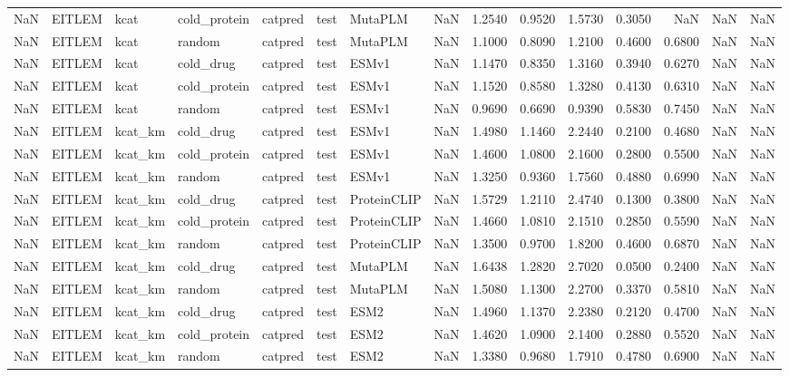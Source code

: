 \begin{tabular}{rlllllllrrrrrrr}
NaN & EITLEM & kcat & cold_protein & catpred & test & MutaPLM & NaN & 1.2540 & 0.9520 & 1.5730 & 0.3050 & NaN & NaN & NaN \\
NaN & EITLEM & kcat & random & catpred & test & MutaPLM & NaN & 1.1000 & 0.8090 & 1.2100 & 0.4600 & 0.6800 & NaN & NaN \\
NaN & EITLEM & kcat & cold_drug & catpred & test & ESMv1 & NaN & 1.1470 & 0.8350 & 1.3160 & 0.3940 & 0.6270 & NaN & NaN \\
NaN & EITLEM & kcat & cold_protein & catpred & test & ESMv1 & NaN & 1.1520 & 0.8580 & 1.3280 & 0.4130 & 0.6310 & NaN & NaN \\
NaN & EITLEM & kcat & random & catpred & test & ESMv1 & NaN & 0.9690 & 0.6690 & 0.9390 & 0.5830 & 0.7450 & NaN & NaN \\
NaN & EITLEM & kcat_km & cold_drug & catpred & test & ESMv1 & NaN & 1.4980 & 1.1460 & 2.2440 & 0.2100 & 0.4680 & NaN & NaN \\
NaN & EITLEM & kcat_km & cold_protein & catpred & test & ESMv1 & NaN & 1.4600 & 1.0800 & 2.1600 & 0.2800 & 0.5500 & NaN & NaN \\
NaN & EITLEM & kcat_km & random & catpred & test & ESMv1 & NaN & 1.3250 & 0.9360 & 1.7560 & 0.4880 & 0.6990 & NaN & NaN \\
NaN & EITLEM & kcat_km & cold_drug & catpred & test & ProteinCLIP & NaN & 1.5729 & 1.2110 & 2.4740 & 0.1300 & 0.3800 & NaN & NaN \\
NaN & EITLEM & kcat_km & cold_protein & catpred & test & ProteinCLIP & NaN & 1.4660 & 1.0810 & 2.1510 & 0.2850 & 0.5590 & NaN & NaN \\
NaN & EITLEM & kcat_km & random & catpred & test & ProteinCLIP & NaN & 1.3500 & 0.9700 & 1.8200 & 0.4600 & 0.6870 & NaN & NaN \\
NaN & EITLEM & kcat_km & cold_drug & catpred & test & MutaPLM & NaN & 1.6438 & 1.2820 & 2.7020 & 0.0500 & 0.2400 & NaN & NaN \\
NaN & EITLEM & kcat_km & random & catpred & test & MutaPLM & NaN & 1.5080 & 1.1300 & 2.2700 & 0.3370 & 0.5810 & NaN & NaN \\
NaN & EITLEM & kcat_km & cold_drug & catpred & test & ESM2 & NaN & 1.4960 & 1.1370 & 2.2380 & 0.2120 & 0.4700 & NaN & NaN \\
NaN & EITLEM & kcat_km & cold_protein & catpred & test & ESM2 & NaN & 1.4620 & 1.0900 & 2.1400 & 0.2880 & 0.5520 & NaN & NaN \\
NaN & EITLEM & kcat_km & random & catpred & test & ESM2 & NaN & 1.3380 & 0.9680 & 1.7910 & 0.4780 & 0.6900 & NaN & NaN \\

\end{tabular}

